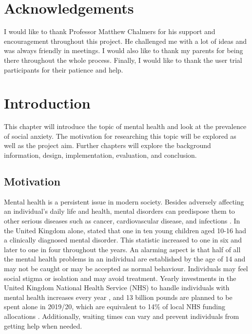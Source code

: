 \documentclass{l4proj}
\begin{document}
\chapter*{Acknowledgements}

I would like to thank Professor Matthew Chalmers for his support and encouragement throughout this project. He challenged me with a lot of ideas and was always friendly in meetings. I would also like to thank my parents for being there throughout the whole process. Finally, I would like to thank the user trial participants for their patience and help.


\def\consentname {Anguel Hristozov} %
\def\consentdate {31 March, 2020} %
%
\educationalconsent


\tableofcontents

\chapter{Introduction}
This chapter will introduce the topic of mental health and look at the prevalence of social anxiety. The motivation for researching this topic will be explored as well as the project aim. Further chapters will explore the background information, design, implementation, evaluation, and conclusion.



\section{Motivation}
Mental health is a persistent issue in modern society. Besides adversely affecting an individual's daily life and health, mental disorders can predispose them to other serious diseases such as cancer, cardiovascular disease, and infections \citep{2013_mental_health_who}. In the United Kingdom alone, \citet{2005_mental_health} stated that one in ten young children aged 10-16 had a clinically diagnosed mental disorder. This statistic increased to one in six \citep{2007_mental_health_} and later to one in four \citep{2016_mental_health_report} throughout the years. An alarming aspect is that half of all the mental health problems in an individual are established by the age of 14 \citep{2016_mental_health_report} and may not be caught or may be accepted as normal behaviour. Individuals may feel social stigma or isolation \citep{2019_isolated} and may avoid treatment. Yearly investments in the United Kingdom National Health Service (NHS) to handle individuals with mental health increases every year \citep{2007_mental_health_costs, 2012_mental_health_costs}, and 13 billion pounds are planned to be spent alone in 2019/20, which are equivalent to 14\% of local NHS funding allocations \citep{2020_mental_health_statistics_funding}. Additionally, waiting times can vary \citep{2020_mental_health_statistics_waiting_time} and prevent individuals from getting help when needed.
\end{document}
